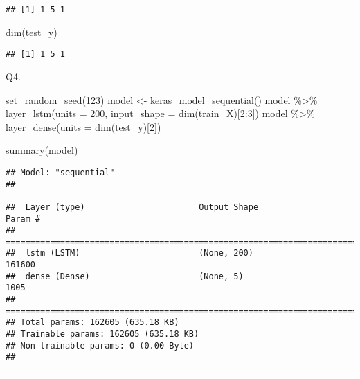 \documentclass[
]{article}
\newenvironment{Shaded}{\begin{snugshade}}{\end{snugshade}}
\newcommand{\AttributeTok}[1]{\textcolor[rgb]{0.77,0.63,0.00}{#1}}
\newcommand{\DecValTok}[1]{\textcolor[rgb]{0.00,0.00,0.81}{#1}}
\newcommand{\FunctionTok}[1]{\textcolor[rgb]{0.00,0.00,0.00}{#1}}
\newcommand{\NormalTok}[1]{#1}
\newcommand{\OtherTok}[1]{\textcolor[rgb]{0.56,0.35,0.01}{#1}}
\newcommand{\SpecialCharTok}[1]{\textcolor[rgb]{0.00,0.00,0.00}{#1}}
\begin{document}
\begin{verbatim}
## [1] 1 5 1
\end{verbatim}

\begin{Shaded}
\begin{Highlighting}[]
\FunctionTok{dim}\NormalTok{(test\_y)}
\end{Highlighting}
\end{Shaded}

\begin{verbatim}
## [1] 1 5 1
\end{verbatim}

Q4.

\begin{Shaded}
\begin{Highlighting}[]
\FunctionTok{set\_random\_seed}\NormalTok{(}\DecValTok{123}\NormalTok{)}
\NormalTok{model }\OtherTok{\textless{}{-}} \FunctionTok{keras\_model\_sequential}\NormalTok{()}
\NormalTok{model }\SpecialCharTok{\%\textgreater{}\%}
  \FunctionTok{layer\_lstm}\NormalTok{(}\AttributeTok{units =} \DecValTok{200}\NormalTok{, }\AttributeTok{input\_shape =} \FunctionTok{dim}\NormalTok{(train\_X)[}\DecValTok{2}\SpecialCharTok{:}\DecValTok{3}\NormalTok{])}
\NormalTok{model }\SpecialCharTok{\%\textgreater{}\%}
  \FunctionTok{layer\_dense}\NormalTok{(}\AttributeTok{units =} \FunctionTok{dim}\NormalTok{(test\_y)[}\DecValTok{2}\NormalTok{])}

\FunctionTok{summary}\NormalTok{(model)}
\end{Highlighting}
\end{Shaded}

\begin{verbatim}
## Model: "sequential"
## ________________________________________________________________________________
##  Layer (type)                       Output Shape                    Param #     
## ================================================================================
##  lstm (LSTM)                        (None, 200)                     161600      
##  dense (Dense)                      (None, 5)                       1005        
## ================================================================================
## Total params: 162605 (635.18 KB)
## Trainable params: 162605 (635.18 KB)
## Non-trainable params: 0 (0.00 Byte)
## ________________________________________________________________________________
\end{verbatim}
\end{document}
